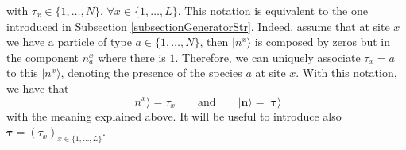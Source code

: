 \documentclass[11pt]{article}
\numberwithin{equation}{section}
\numberwithin{equation}{subsection}
\begin{document}
with $\tau_{x}\in \{1,\ldots,N\}$, $\forall x\in \{1,\ldots,L\}$. This notation is equivalent to the one introduced in Subsection \ref{subsectionGeneratorStr}. Indeed, assume that at site $x$ we have a particle of type $a\in\{1,\ldots,N\} $, then $|n^{x}\rangle$ is composed by zeros but in the component $n_{a}^{x}$ where there is $1$. Therefore, we can uniquely associate  $\tau_{x}=a$ to this $|n^{x}\rangle$, denoting the presence of the species $a$ at site $x$. With this notation, we have that 
\begin{equation}\label{notation}
	|n^{x}\rangle =\tau_{x}\qquad \text{and}\qquad|\bm{n}\rangle=|\bm{\tau}\rangle
\end{equation}
with the meaning explained above. It will be useful to introduce also $\bm{\tau}=(\tau_{x})_{x\in \{1,\ldots,L\}}$. 

\end{document}
